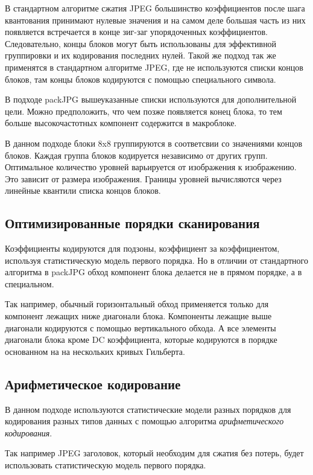 \documentclass{matmex-diploma-custom}
\begin{document}
В стандартном алгоритме сжатия JPEG большинство коэффициентов после шага квантования принимают нулевые значения и на самом деле большая часть из них появляется встречается в конце зиг-заг упорядоченных коэффициентов. Следовательно, концы блоков могут быть использованы для эффективной группировки и их кодирования последних нулей. Такой же подход так же применятся в стандартном алгоритме JPEG, где не используются списки концов блоков, там концы блоков кодируются с помощью специального символа.


В подходе packJPG вышеуказанные списки используются для дополнительной цели. Можно предположить, что чем позже появляется конец блока, то тем больше высокочастотных компонент содержится в макроблоке.


В данном подходе блоки 8x8 группируются в соответсвии со значениями концов блоков. Каждая группа блоков кодируется независимо от других групп. Оптимальное количество уровней варьируется от изображения к изображению. Это зависит от размера изображения. Границы  уровней вычисляются через линейные квантили списка концов блоков.



\subsection{Оптимизированные порядки сканирования}
Коэффициенты кодируются для подзоны, коэффициент за коэффициентом, используя статистическую модель первого порядка. Но в отличии от стандартного алгоритма в packJPG обход компонент блока делается не в прямом порядке, а в специальном.

Так например, обычный горизонтальный обход применяется только для компонент лежащих ниже диагонали блока. Компоненты лежащие выше диагонали кодируются с помощью вертикального обхода. А все элементы диагонали блока кроме DC коэффициента, которые кодируются в порядке основанном на на нескольких кривых Гильберта.

\subsection{Арифметическое кодирование}

В данном подходе используются статистические модели разных порядков для кодирования разных типов данных с помощью алгоритма  \emph{арифметического кодирования}.

Так например JPEG заголовок, который необходим для сжатия без потерь, будет использовать статистическую модель первого порядка.
\end{document}
